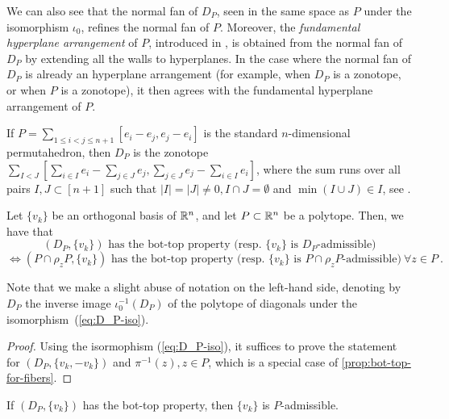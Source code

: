 We can also see that the normal fan of $D_P$, seen in the same space as $P$ under the isomorphism $\iota_0$, refines the normal fan of $P$. 
Moreover, the \emph{fundamental hyperplane arrangement} of $P$, introduced in \cite[Definition 1.18]{GLA21}, is obtained from the normal fan of $D_P$ by extending all the walls to hyperplanes. 
In the case where the normal fan of $D_P$ is already an hyperplane arrangement (for example, when $D_P$ is a zonotope, or when $P$ is a zonotope), it then agrees with the fundamental hyperplane arrangement of $P$. 

\begin{example}
	\label{e:permutahedron}
	If $P=\sum_{1 \leq i<j \leq n+1} [e_i-e_j, e_j-e_i]$ is the standard $n$-dimensional permutahedron, then $D_P$ is the zonotope $\sum_{I<J} [\sum_{i \in I}e_i - \sum_{j \in J}e_j, \sum_{j \in J} e_j - \sum_{i \in I}e_i]$, where the sum runs over all pairs $I,J\subset [n+1]$ such that $|I|=|J|\neq 0, I\cap J = \emptyset$ and $\min(I \cup J) \in I$, see \cite[Theorem 3.6]{GLA21}.
\end{example}

\begin{lemma} \label{l:bot-top-for-DP}
	Let $\{v_k\}$ be an orthogonal basis of $\mathbb{R}^n$, and let $P\subset \mathbb{R}^n$ be a polytope.
	Then, we have that
	\[
	(D_P,\{v_k\}) \text{ has the bot-top property (resp. } \{v_k\} \text{ is }D_P\text{-admissible)}
	\]
	\[
	\iff (P\cap \rho_z P,\{v_k\}) \text{ has the bot-top property (resp. } \{v_k\} \text{ is }P\cap \rho_z P\text{-admissible)} \ \forall z \in P \ .
	\]
\end{lemma}

Note that we make a slight abuse of notation on the left-hand side, denoting by $D_P$ the inverse image $\iota_0^{-1}(D_P)$ of the polytope of diagonals under the isomorphism~(\ref{eq:D_P-iso}).

\begin{proof}
	Using the isormophism (\ref{eq:D_P-iso}), it suffices to prove the statement for $(D_P,\{v_k,-v_k\})$ and $\pi^{-1}(z), z \in P$, which is a special case of \cref{prop:bot-top-for-fibers}.
\end{proof}

\begin{proposition}
	If $(D_P,\{v_k\})$ has the bot-top property, then $\{v_k\}$ is $P$-admissible. 
\end{proposition}

